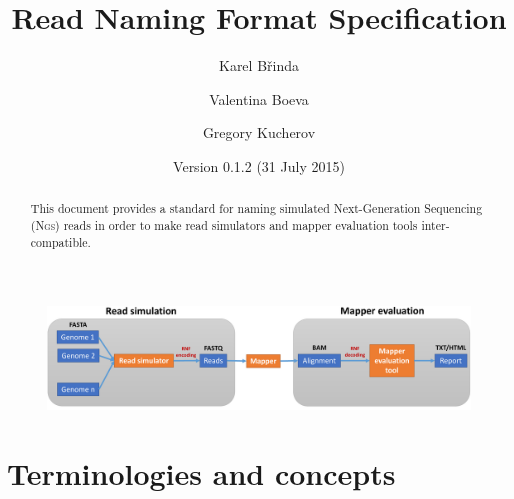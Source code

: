 \documentclass[10pt,a4paper]{article}
\title{Read Naming Format Specification}
\date{Version 0.1.2 (31 July 2015)}
\author{Karel Břinda \and Valentina Boeva \and Gregory Kucherov}
\newcommand{\RNF}{\textsc{Rnf}}
\newcommand{\NGS}{\textsc{Ngs}}
\begin{document}
\maketitle


\begin{abstract}
	This document provides a standard for
	naming simulated Next-Generation Sequencing (\NGS) reads
	in order to make read simulators and mapper evaluation tools inter-compatible.
\end{abstract}


\bigskip

\begin{figure}[h]
\includegraphics[width=\textwidth]{evaluation_rnf_cropped.pdf}
\end{figure}



\section{Terminologies and concepts}
\end{document}
